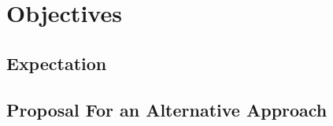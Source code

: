 




\chapter{Objectives}

\lipsum %

\section{Expectation}

\lipsum %

\section{Proposal For an Alternative Approach}

\lipsum %